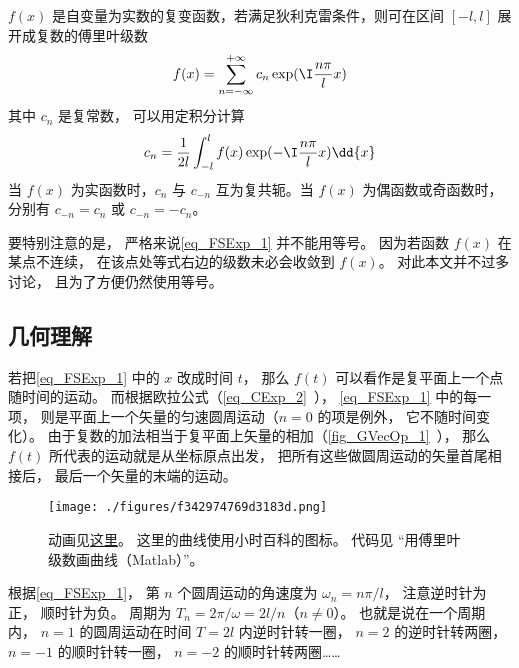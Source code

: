
$f(x)$ 是自变量为实数的复变函数，若满足狄利克雷条件，则可在区间 $[- l,l]$ 展开成复数的傅里叶级数
\begin{equation}\label{eq_FSExp_1}
f(x) = \sum_{n =  - \infty }^{ + \infty } c_n \exp ( \I\frac{n\pi }{l}x )
\end{equation}
其中 $c_n$ 是复常数， 可以用定积分计算
\begin{equation}\label{eq_FSExp_2}
c_n = \frac{1}{2l} \int_{ - l}^l  f(x)\exp( -\I\frac{n\pi }{l}x ) \dd{x} 
\end{equation}
当 $f(x)$ 为实函数时，$c_n$ 与 $c_{-n}$ 互为复共轭。当 $f(x)$ 为偶函数或奇函数时，分别有 $c_{-n} = c_n$ 或 $c_{-n} = -c_n$。

要特别注意的是， 严格来说\autoref{eq_FSExp_1} 并不能用等号。 因为若函数 $f(x)$ 在某点不连续， 在该点处等式右边的级数未必会收敛到 $f(x)$。 对此本文并不过多讨论， 且为了方便仍然使用等号。

\subsection{几何理解}
若把\autoref{eq_FSExp_1} 中的 $x$ 改成时间 $t$， 那么 $f(t)$ 可以看作是复平面上一个点随时间的运动。 而根据欧拉公式（\autoref{eq_CExp_2}~）， \autoref{eq_FSExp_1} 中的每一项， 则是平面上一个矢量的匀速圆周运动（$n=0$ 的项是例外， 它不随时间变化）。 由于复数的加法相当于复平面上矢量的相加（\autoref{fig_GVecOp_1}~）， 那么 $f(t)$ 所代表的运动就是从坐标原点出发， 把所有这些做圆周运动的矢量首尾相接后， 最后一个矢量的末端的运动。

\begin{figure}[ht]
\centering
\texttt{[image: ./figures/f342974769d3183d.png]}
\caption{动画见\href{https://wuli.wiki/apps/FFTplt.html}{这里}。 这里的曲线使用小时百科的图标。 代码见 “用傅里叶级数画曲线（Matlab）”。} \label{fig_FSExp_1}
\end{figure}

根据\autoref{eq_FSExp_1}， 第 $n$ 个圆周运动的角速度为 $\omega_n = n\pi/l$， 注意逆时针为正， 顺时针为负。 周期为 $T_n = 2\pi/\omega = 2l/n$（$n\ne 0$）。 也就是说在一个周期内， $n=1$ 的圆周运动在时间 $T = 2l$ 内逆时针转一圈， $n=2$ 的逆时针转两圈， $n=-1$ 的顺时针转一圈， $n=-2$ 的顺时针转两圈……

